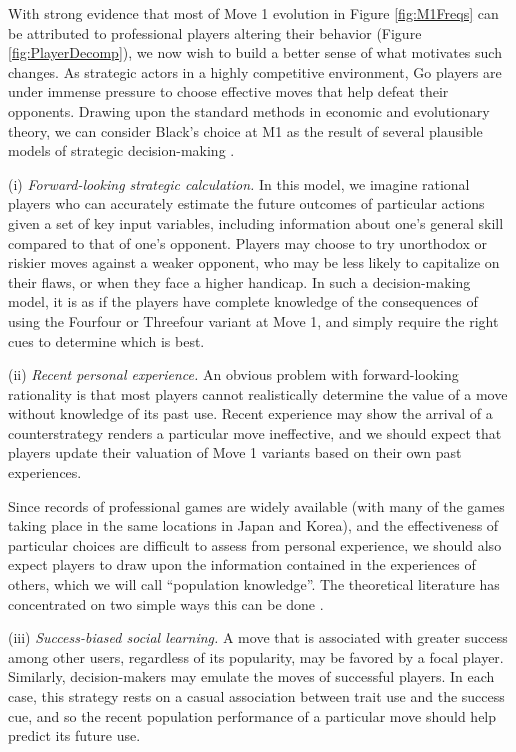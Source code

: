 With strong evidence that most of Move 1 evolution in Figure \ref{fig:M1Freqs} can be attributed to professional players altering their behavior (Figure \ref{fig:PlayerDecomp}), we now wish to build a better sense of what motivates such changes.  As strategic actors in a highly competitive environment, Go players are under immense pressure to choose effective moves that help defeat their opponents.  Drawing upon the standard methods in economic and evolutionary theory, we can consider Black's choice at M1 as the result of several plausible models of strategic decision-making \citep{bowles2006microeconomics}.  

(i) \textit{Forward-looking strategic calculation.}  In this model, we imagine rational players who can accurately estimate the future outcomes of particular actions given a set of key input variables, including information about one's general skill compared to that of one's opponent.  Players may choose to try unorthodox or riskier moves against a weaker opponent, who may be less likely to capitalize on their flaws, or when they face a higher handicap.  In such a decision-making model, it is as if the players have complete knowledge of the consequences of using the Fourfour or Threefour variant at Move 1, and simply require the right cues to determine which is best.

(ii) \textit{Recent personal experience.} An obvious problem with forward-looking rationality is that most players cannot realistically determine the value of a move without knowledge of its past use.  Recent experience may show the arrival of a counterstrategy renders a particular move ineffective, and we should expect that players update their valuation of Move 1 variants based on their own past experiences.  

Since records of professional games are widely available (with many of the games taking place in the same locations in Japan and Korea), and the effectiveness of particular choices are difficult to assess from personal experience, we should also expect players to draw upon the information contained in the experiences of others, which we will call ``population knowledge''.  The theoretical literature has concentrated on two simple ways this can be done \citep{boyd1985culture, mcelreath2008beyond}.

(iii) \textit{Success-biased social learning.}  A move that is associated with greater success among other users, regardless of its popularity, may be favored by a focal player.  Similarly, decision-makers may emulate the moves of successful players.  In each case, this strategy rests on a casual association between trait use and the success cue, and so the recent population performance of a particular move should help predict its future use.


